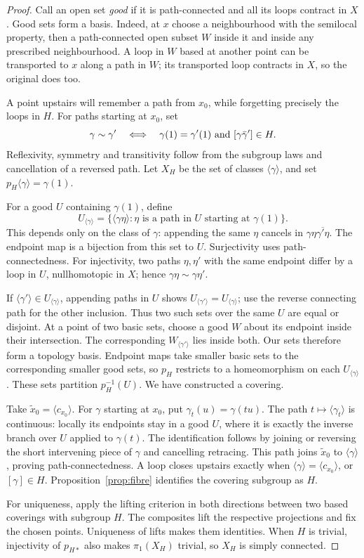 \begin{proof}
Call an open set \emph{good} if it is path-connected and all its loops contract in $X$. Good sets form a basis. Indeed, at $x$ choose a neighbourhood with the semilocal property, then a path-connected open subset $W$ inside it and inside any prescribed neighbourhood. A loop in $W$ based at another point can be transported to $x$ along a path in $W$; its transported loop contracts in $X$, so the original does too.

A point upstairs will remember a path from $x_0$, while forgetting precisely the loops in $H$. For paths starting at $x_0$, set
\[
\gamma\sim\gamma'\quad\Longleftrightarrow\quad
\gamma(1)=\gamma'(1)\ \hbox{and}\ [\gamma\bar\gamma']\in H.
\]
Reflexivity, symmetry and transitivity follow from the subgroup laws and cancellation of a reversed path. Let $X_H$ be the set of classes $\langle\gamma\rangle$, and set $p_H\langle\gamma\rangle=\gamma(1)$.

For a good $U$ containing $\gamma(1)$, define
\[
U_{\langle\gamma\rangle}=
\{\langle\gamma\eta\rangle:\eta\text{ is a path in }U\text{ starting at }\gamma(1)\}.
\]
This depends only on the class of $\gamma$: appending the same $\eta$ cancels in $\gamma\eta\overline{\gamma'\eta}$. The endpoint map is a bijection from this set to $U$. Surjectivity uses path-connectedness. For injectivity, two paths $\eta,\eta'$ with the same endpoint differ by a loop in $U$, nullhomotopic in $X$; hence $\gamma\eta\sim\gamma\eta'$.

If $\langle\gamma'\rangle\in U_{\langle\gamma\rangle}$, appending paths in $U$ shows $U_{\langle\gamma'\rangle}=U_{\langle\gamma\rangle}$; use the reverse connecting path for the other inclusion. Thus two such sets over the same $U$ are equal or disjoint. At a point of two basic sets, choose a good $W$ about its endpoint inside their intersection. The corresponding $W_{\langle\gamma'\rangle}$ lies inside both. Our sets therefore form a topology basis. Endpoint maps take smaller basic sets to the corresponding smaller good sets, so $p_H$ restricts to a homeomorphism on each $U_{\langle\gamma\rangle}$. These sets partition $p_H^{-1}(U)$. We have constructed a covering.

Take $\tilde x_0=\langle c_{x_0}\rangle$. For $\gamma$ starting at $x_0$, put $\gamma_t(u)=\gamma(tu)$. The path $t\mapsto\langle\gamma_t\rangle$ is continuous: locally its endpoints stay in a good $U$, where it is exactly the inverse branch over $U$ applied to $\gamma(t)$. The identification follows by joining or reversing the short intervening piece of $\gamma$ and cancelling retracing. This path joins $\tilde x_0$ to $\langle\gamma\rangle$, proving path-connectedness. A loop closes upstairs exactly when $\langle\gamma\rangle=\langle c_{x_0}\rangle$, or $[\gamma]\in H$. Proposition~\ref{prop:fibre} identifies the covering subgroup as $H$.

For uniqueness, apply the lifting criterion in both directions between two based coverings with subgroup $H$. The composites lift the respective projections and fix the chosen points. Uniqueness of lifts makes them identities. When $H$ is trivial, injectivity of $p_{H*}$ also makes $\pi_1(X_H)$ trivial, so $X_H$ is simply connected.
\end{proof}

